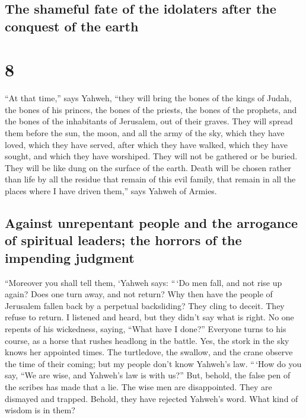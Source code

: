 \hypertarget{the-shameful-fate-of-the-idolaters-after-the-conquest-of-the-earth}{%
\subsection{The shameful fate of the idolaters after the conquest of the
earth}\label{the-shameful-fate-of-the-idolaters-after-the-conquest-of-the-earth}}

\hypertarget{section-7}{%
\section{8}\label{section-7}}

 ``At that time,'' says Yahweh, ``they will bring the
bones of the kings of Judah, the bones of his princes, the bones of the
priests, the bones of the prophets, and the bones of the inhabitants of
Jerusalem, out of their graves.  They will spread them
before the sun, the moon, and all the army of the sky, which they have
loved, which they have served, after which they have walked, which they
have sought, and which they have worshiped. They will not be gathered or
be buried. They will be like dung on the surface of the earth.
 Death will be chosen rather than life by all the residue
that remain of this evil family, that remain in all the places where I
have driven them,'' says Yahweh of Armies.

\hypertarget{against-unrepentant-people-and-the-arrogance-of-spiritual-leaders-the-horrors-of-the-impending-judgment}{%
\subsection{Against unrepentant people and the arrogance of spiritual
leaders; the horrors of the impending
judgment}\label{against-unrepentant-people-and-the-arrogance-of-spiritual-leaders-the-horrors-of-the-impending-judgment}}

 ``Moreover you shall tell them, `Yahweh says: ``\,`Do men
fall, and not rise up again? Does one turn away, and not return?
 Why then have the people of Jerusalem fallen back by a
perpetual backsliding? They cling to deceit. They refuse to return.
 I listened and heard, but they didn't say what is right.
No one repents of his wickedness, saying, ``What have I done?'' Everyone
turns to his course, as a horse that rushes headlong in the battle.
 Yes, the stork in the sky knows her appointed times. The
turtledove, the swallow, and the crane observe the time of their coming;
but my people don't know Yahweh's law.  ``\,`How do you
say, ``We are wise, and Yahweh's law is with us?'' But, behold, the
false pen of the scribes has made that a lie.  The wise
men are disappointed. They are dismayed and trapped. Behold, they have
rejected Yahweh's word. What kind of wisdom is in them?

